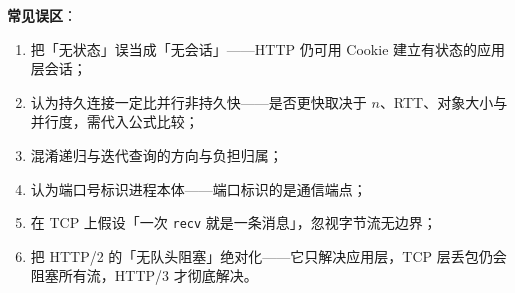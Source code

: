 \textbf{常见误区}：

\begin{enumerate}
    \item 把「无状态」误当成「无会话」——HTTP 仍可用 Cookie 建立有状态的应用层会话；
    \item 认为持久连接一定比并行非持久快——是否更快取决于 $n$、RTT、对象大小与并行度，需代入公式比较；
    \item 混淆递归与迭代查询的方向与负担归属；
    \item 认为端口号标识进程本体——端口标识的是通信端点；
    \item 在 TCP 上假设「一次 \texttt{recv} 就是一条消息」，忽视字节流无边界；
    \item 把 HTTP/2 的「无队头阻塞」绝对化——它只解决应用层，TCP 层丢包仍会阻塞所有流，HTTP/3 才彻底解决。
\end{enumerate}
